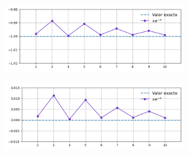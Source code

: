 \begin{enumerate}
          \begin{figure}[H]
            \centering
            \begin{subfigure}[b]{8cm}
                \includegraphics[width=8cm]{Graphics/problema03_fun_f2.png}
                \caption{}
            \end{subfigure}
            \begin{subfigure}[b]{8cm}
                \includegraphics[width=8cm]{Graphics/problema03_diff_f2.png}
                \caption{}
            \end{subfigure}
            \caption{}
        \end{figure}
\end{enumerate}